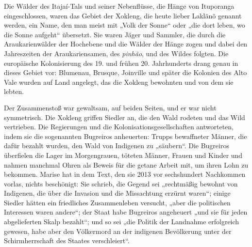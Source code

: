\documentclass[
  ngerman,
  11pt,
  openany]{book}
\begin{document}
Die Wälder des Itajaí-Tals und seiner Nebenflüsse, die Hänge von
Ituporanga eingeschlossen, waren das Gebiet der Xokleng, die heute
lieber Laklãnõ genannt werden, ein Name, den man meist mit „Volk der
Sonne`` oder „die dort leben, wo die Sonne aufgeht`` übersetzt. Sie
waren Jäger und Sammler, die durch die Araukarienwälder der Hochebene
und die Wälder der Hänge zogen und dabei den Jahreszeiten der
Araukariensamen, des \emph{pinhão}, und des Wildes folgten. Die
europäische Kolonisierung des 19. und frühen 20. Jahrhunderts drang
genau in dieses Gebiet vor: Blumenau, Brusque, Joinville und später die
Kolonien des Alto Vale wurden auf Land angelegt, das die Xokleng
bewohnten und von dem sie lebten.

Der Zusammenstoß war gewaltsam, auf beiden Seiten, und er war nicht
symmetrisch. Die Xokleng griffen Siedler an, die den Wald rodeten und
das Wild vertrieben. Die Regierungen und die Kolonisationsgesellschaften
antworteten, indem sie die sogenannten Bugreiros anheuerten: Trupps
bewaffneter Männer, die dafür bezahlt wurden, den Wald von Indigenen zu
„säubern``. Die Bugreiros überfielen die Lager im Morgengrauen, töteten
Männer, Frauen und Kinder und nahmen manchmal Ohren als Beweis für die
getane Arbeit mit, um ihren Lohn zu bekommen. Marise hat in dem Text,
den sie 2013 vor sechshundert Nachkommen vorlas, nichts beschönigt: Sie
schrieb, die Gegend sei „rechtmäßig bewohnt von Indigenen, die über die
Invasion und die Missachtung erzürnt waren``; einige Siedler hätten ein
friedliches Zusammenleben versucht, „aber die politischen Interessen
waren andere``; der Staat habe Bugreiros angeheuert „und sie für jeden
abgelieferten Skalp bezahlt``; und so sei „die Politik der Landnahme
erfolgreich gewesen, habe aber den Völkermord an der indigenen
Bevölkerung unter der Schirmherrschaft des Staates verschleiert``.
\end{document}

